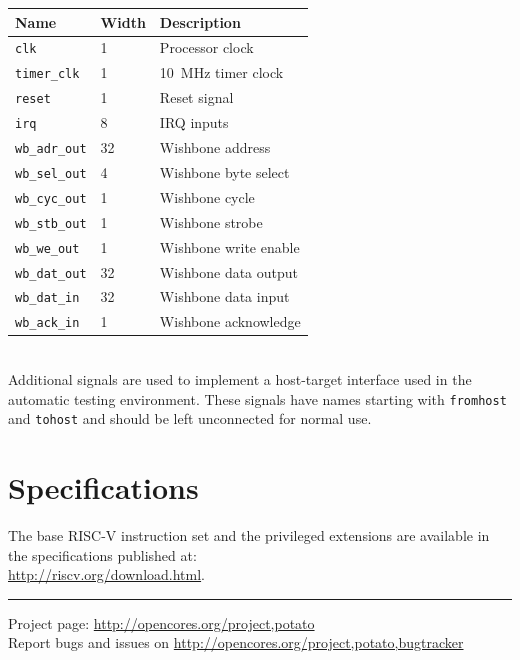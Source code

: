 \documentclass[10pt,a4paper]{article}
\begin{document}
\begin{minipage}[t]{0.48\textwidth}
\begin{tabularx}{\textwidth}{|l|l|X|}
\hline
\textbf{Name} & \textbf{Width} & \textbf{Description} \\
\hline
\texttt{clk} & 1 & Processor clock \\
\texttt{timer\_clk} & 1 & 10~MHz timer clock \\
\texttt{reset} & 1 & Reset signal \\
\hline
\texttt{irq} & 8 & IRQ inputs \\
\hline
\texttt{wb\_adr\_out} & 32 & Wishbone address \\
\texttt{wb\_sel\_out} & 4 & Wishbone byte select \\
\texttt{wb\_cyc\_out} & 1 & Wishbone cycle \\
\texttt{wb\_stb\_out} & 1 & Wishbone strobe \\
\texttt{wb\_we\_out} & 1 & Wishbone write enable \\
\texttt{wb\_dat\_out} & 32 & Wishbone data output \\
\texttt{wb\_dat\_in} & 32 & Wishbone data input \\
\texttt{wb\_ack\_in} & 1 & Wishbone acknowledge \\
\hline
\end{tabularx}\\

Additional signals are used to implement a host-target interface used in the automatic testing
environment. These signals have names starting with \texttt{fromhost} and \texttt{tohost} and
should be left unconnected for normal use.\\

\section{Specifications}

The base RISC-V instruction set and the privileged extensions are available in the
specifications published at:\\

\url{http://riscv.org/download.html}.

\end{minipage}

\vfill
\noindent\rule{\linewidth}{1pt}
{\small
Project page: \url{http://opencores.org/project,potato}\\
Report bugs and issues on \url{http://opencores.org/project,potato,bugtracker}}
\end{document}
